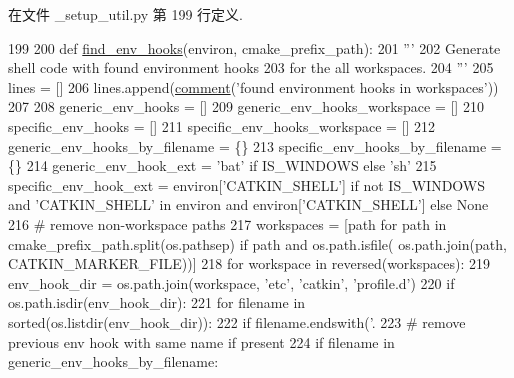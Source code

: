 在文件 \-\_\-setup\-\_\-util.\-py 第 199 行定义.


\begin{DoxyCode}
199 
200 \textcolor{keyword}{def }\hyperlink{namespace__setup__util_aad4a41589ebc32e81406c63db26e721a}{find\_env\_hooks}(environ, cmake\_prefix\_path):
201     \textcolor{stringliteral}{'''}
202 \textcolor{stringliteral}{    Generate shell code with found environment hooks}
203 \textcolor{stringliteral}{    for the all workspaces.}
204 \textcolor{stringliteral}{    '''}
205     lines = []
206     lines.append(\hyperlink{namespace__setup__util_a9d73115db9efca5c20b575f96b9eb065}{comment}(\textcolor{stringliteral}{'found environment hooks in workspaces'}))
207 
208     generic\_env\_hooks = []
209     generic\_env\_hooks\_workspace = []
210     specific\_env\_hooks = []
211     specific\_env\_hooks\_workspace = []
212     generic\_env\_hooks\_by\_filename = \{\}
213     specific\_env\_hooks\_by\_filename = \{\}
214     generic\_env\_hook\_ext = \textcolor{stringliteral}{'bat'} \textcolor{keywordflow}{if} IS\_WINDOWS \textcolor{keywordflow}{else} \textcolor{stringliteral}{'sh'}
215     specific\_env\_hook\_ext = environ[\textcolor{stringliteral}{'CATKIN\_SHELL'}] \textcolor{keywordflow}{if} \textcolor{keywordflow}{not} IS\_WINDOWS \textcolor{keywordflow}{and} \textcolor{stringliteral}{'CATKIN\_SHELL'} \textcolor{keywordflow}{in} environ \textcolor{keywordflow}{and} 
      environ[\textcolor{stringliteral}{'CATKIN\_SHELL'}] \textcolor{keywordflow}{else} \textcolor{keywordtype}{None}
216     \textcolor{comment}{# remove non-workspace paths}
217     workspaces = [path \textcolor{keywordflow}{for} path \textcolor{keywordflow}{in} cmake\_prefix\_path.split(os.pathsep) \textcolor{keywordflow}{if} path \textcolor{keywordflow}{and} os.path.isfile(
      os.path.join(path, CATKIN\_MARKER\_FILE))]
218     \textcolor{keywordflow}{for} workspace \textcolor{keywordflow}{in} reversed(workspaces):
219         env\_hook\_dir = os.path.join(workspace, \textcolor{stringliteral}{'etc'}, \textcolor{stringliteral}{'catkin'}, \textcolor{stringliteral}{'profile.d'})
220         \textcolor{keywordflow}{if} os.path.isdir(env\_hook\_dir):
221             \textcolor{keywordflow}{for} filename \textcolor{keywordflow}{in} sorted(os.listdir(env\_hook\_dir)):
222                 \textcolor{keywordflow}{if} filename.endswith(\textcolor{stringliteral}{'.%
223                     \textcolor{comment}{# remove previous env hook with same name if present}
224                     \textcolor{keywordflow}{if} filename \textcolor{keywordflow}{in} generic\_env\_hooks\_by\_filename:
}
\end{DoxyCode}
